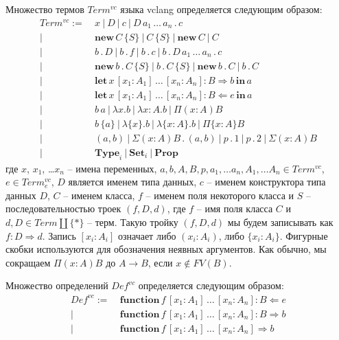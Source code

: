 \documentclass{amsart}
\theoremstyle{definition}
\theoremstyle{remark}
\newcommand{\red}{\Rightarrow}
\numberwithin{figure}{section}
\begin{document}
Множество термов $Term^{vc}$ языка vclang определяется следующим образом:
\begin{align*}
Term^{vc} :=\ & x\ |\ D\ |\ c\ |\ D\,a_1\,\ldots\,a_n\,.\,c \\
      |\ & \mathbf{new}\,C\,\{ S \}\ |\ C\,\{ S \}\ |\ \mathbf{new}\,C\ |\ C \\
      |\ & b\,.\,D\ |\ b\,.\,f\ |\ b\,.\,c\ |\ b\,.\,D\,a_1\,\ldots\,a_n\,.\,c \\
      |\ & \mathbf{new}\,b\,.\,C\,\{ S \}\ |\ b\,.\,C\,\{ S \}\ |\ \mathbf{new}\,b\,.\,C\ |\ b\,.\,C \\
      |\ & \mathbf{let}\,x\,[x_1 : A_1]\,\ldots\,[x_n : A_n] : B \Rightarrow b\,\mathbf{in}\,a \\
      |\ & \mathbf{let}\,x\,[x_1 : A_1]\,\ldots\,[x_n : A_n] : B \Leftarrow e\,\mathbf{in}\,a \\
      |\ & b\,a\ |\ \lambda x. b\ |\ \lambda x : A. b\ |\ \Pi (x : A) B \\
      |\ & b\,\{a\}\ |\ \lambda \{x\}. b\ |\ \lambda \{x : A\}. b\ |\ \Pi \{x : A\} B \\
      |\ & (a,b)\ |\ \Sigma (x : A) B\,.\,(a,b)\ |\ p\,.\,1\ |\ p\,.\,2\ |\ \Sigma (x : A) B \\
      |\ & \mathbf{Type}_i\ |\ \mathbf{Set}_i\ |\ \mathbf{Prop}
\end{align*}
где $x$, $x_1$, \ldots $x_n$ -- имена переменных, $a, b, A, B, p, a_1, \ldots a_n, A_1, \ldots A_n \in Term^{vc}$, $e \in Term^{vc}_e$, $D$ является именем типа данных, $c$ -- именем конструктора типа данных $D$, $C$ -- именем класса, $f$ -- именем поля некоторого класса и $S$ -- последовательностью троек $(f,D,d)$, где $f$ -- имя поля класса $C$ и $d,D \in Term \amalg \{ * \}$ -- терм.
Такую тройку $(f,D,d)$ мы будем записывать как $f : D \red d$.
Запись $[x_i : A_i]$ означает либо $(x_i : A_i)$, либо $\{x_i : A_i\}$.
Фигурные скобки используются для обозначения неявных аргументов.
Как обычно, мы сокращаем $\Pi (x : A) B$ до $A \to B$, если $x \notin FV(B)$.

Множество определений $Def^{vc}$ определяется следующим образом:
\begin{align*}
Def^{vc} :=\ & \mathbf{function}\,f\,[x_1 : A_1]\,\ldots\,[x_n : A_n] : B \Leftarrow e \\
    |\ & \mathbf{function}\,f\,[x_1 : A_1]\,\ldots\,[x_n : A_n] : B \Rightarrow b \\
    |\ & \mathbf{function}\,f\,[x_1 : A_1]\,\ldots\,[x_n : A_n] \Rightarrow b \\
\end{align*}
\end{document}
